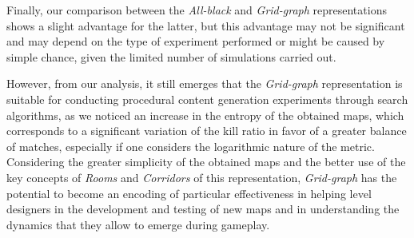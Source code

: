\documentclass{Configuration_Files/PoliMi3i_thesis}
\begin{document}
Finally, our comparison between the \textit{All-black} and \textit{Grid-graph} representations shows a slight advantage for the latter, but this advantage may not be significant and may depend on the type of experiment performed or might be caused by simple chance, given the limited number of simulations carried out.

However, from our analysis, it still emerges that the \textit{Grid-graph} representation is suitable for conducting procedural content generation experiments through search algorithms, as we noticed an increase in the entropy of the obtained maps, which corresponds to a significant variation of the kill ratio in favor of a greater balance of matches, especially if one considers the logarithmic nature of the metric. Considering the greater simplicity of the obtained maps and the better use of the key concepts of \textit{Rooms} and \textit{Corridors} of this representation, \textit{Grid-graph} has the potential to become an encoding of particular effectiveness in helping level designers in the development and testing of new maps and in understanding the dynamics that they allow to emerge during gameplay.




\cleardoublepage
{} %
\appendix




\cleardoublepage
\end{document}
